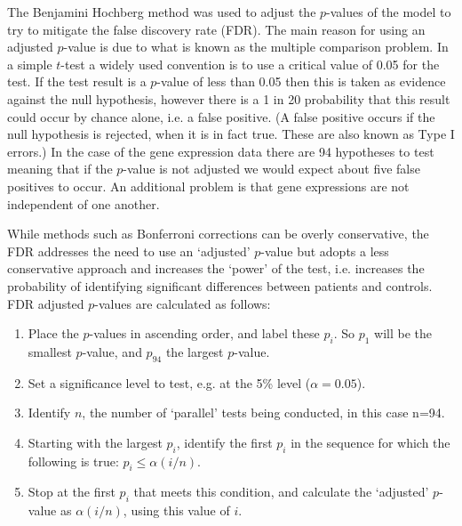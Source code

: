 \documentclass[a4paper, 12pt]{report}
\begin{document}
The Benjamini Hochberg \cite{FDR} method was used to adjust the $p$-values of the model to try to mitigate the false discovery rate (\gls{FDR}). The main reason for using an adjusted $p$-value is due to what is known as the multiple comparison problem. In a simple $t$-test a widely used convention is to use a critical value of 0.05 for the test. If the test result is a $p$-value of less than 0.05 then this is taken as evidence against the null hypothesis, however there is a 1 in 20 probability that this result could occur by chance alone, i.e. a false positive. (A false positive occurs if the null hypothesis is rejected, when it is in fact true. These are also known as Type I errors.)  In the case of the gene expression data there are 94 hypotheses to test meaning that if the $p$-value is not adjusted we would expect about five false positives to occur. An additional problem is that gene expressions are not independent of one another.

While methods such as Bonferroni corrections can be overly conservative, the FDR addresses the need to use an `adjusted' $p$-value but adopts a less conservative approach and increases the ‘power’ of the test, i.e. increases the probability of identifying significant differences between patients and controls.  FDR adjusted $p$-values are calculated as follows:

\begin{enumerate}

\item Place the $p$-values in ascending order, and label these $p_i$. So $p_1$ will be the smallest $p$-value, and $p_{94}$ the largest $p$-value.
\item Set a significance level to test, e.g. at the 5\% level ($\alpha= 0.05$).
\item Identify $n$, the number of ‘parallel’ tests being conducted, in this case n=94.
\item Starting with the largest $p_i$, identify the first $p_i$ in the sequence for which the following is true: $p_i \le \alpha(i / n)$.
\item Stop at the first $p_i$ that meets this condition, and calculate the `adjusted' $p$-value as $\alpha (i / n)$, using this value of $i$.

\end{enumerate}
\end{document}
